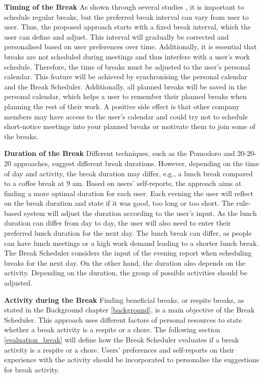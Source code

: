 \documentclass{hasel_thesis}
\begin{document}
\textbf{Timing of the Break}
As shown through several studies \cite{Largo-Wight.2017, KimS.ParkY.&Niu.2017}, it is important to schedule regular breaks, but the preferred break interval can vary from user to user. Thus, the proposed approach starts with a fixed break interval, which the user can define and adjust. This interval will gradually be corrected and personalised based on user preferences over time. Additionally, it is essential that breaks are not scheduled during meetings and thus interfere with a user's work schedule. Therefore, the time of breaks must be adjusted to the user's personal calendar. This feature will be achieved by synchronising the personal calendar and the Break Scheduler. Additionally, all planned breaks will be saved in the personal calendar, which helps a user to remember their planned breaks when planning the rest of their work. A positive side effect is that other company members may have access to the user's calendar and could try not to schedule short-notice meetings into your planned breaks or motivate them to join some of the breaks.

\textbf{Duration of the Break}
Different techniques, such as the Pomodoro and 20-20-20 approaches, suggest different break durations. However, depending on the time of day and activity, the break duration may differ, e.g., a lunch break compared to a coffee break at 9 am. Based on users' self-reports, the approach aims at finding a more optimal duration for each user. Each evening the user will reflect on the break duration and state if it was good, too long or too short. The rule-based system will adjust the duration according to the user's input. As the lunch duration can differ from day to day, the user will also need to enter their preferred lunch duration for the next day. The lunch break can differ, as people can have lunch meetings or a high work demand leading to a shorter lunch break. The Break Scheduler considers the input of the evening report when scheduling breaks for the next day. On the other hand, the duration also depends on the activity. Depending on the duration, the group of possible activities should be adjusted.

\textbf{Activity during the Break}
Finding beneficial breaks, or respite breaks, as stated in the Background chapter \ref{background}, is a main objective of the Break Scheduler. This approach uses different factors of personal resources to state whether a break activity is a respite or a chore. The following section \ref{evaluation_break} will define how the Break Scheduler evaluates if a break activity is a respite or a chore. Users' preferences and self-reports on their experience with the activity should be incorporated to personalise the suggestions for break activity. 
\end{document}
